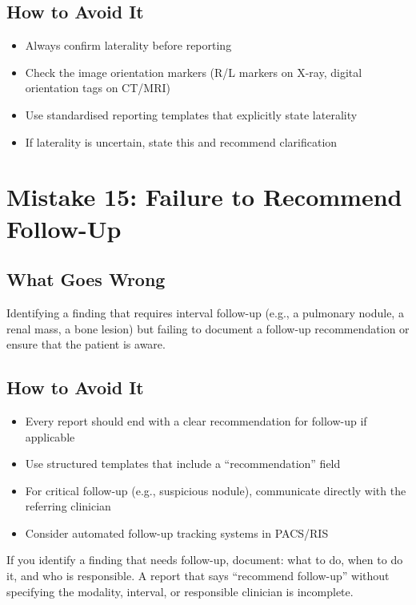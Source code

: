 \subsection{How to Avoid It}
\begin{itemize}
    \item Always confirm laterality before reporting
    \item Check the image orientation markers (R/L markers on X-ray, digital orientation tags on CT/MRI)
    \item Use standardised reporting templates that explicitly state laterality
    \item If laterality is uncertain, state this and recommend clarification
\end{itemize}

\clearpage

\section{Mistake 15: Failure to Recommend Follow-Up}

\subsection{What Goes Wrong}
Identifying a finding that requires interval follow-up (e.g., a pulmonary nodule, a renal mass, a bone lesion) but failing to document a follow-up recommendation or ensure that the patient is aware.

\subsection{How to Avoid It}
\begin{itemize}
    \item Every report should end with a clear recommendation for follow-up if applicable
    \item Use structured templates that include a ``recommendation'' field
    \item For critical follow-up (e.g., suspicious nodule), communicate directly with the referring clinician
    \item Consider automated follow-up tracking systems in PACS/RIS
\end{itemize}

\begin{pearlbox}
If you identify a finding that needs follow-up, document: what to do, when to do it, and who is responsible. A report that says ``recommend follow-up'' without specifying the modality, interval, or responsible clinician is incomplete.
\end{pearlbox}


